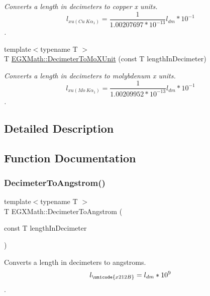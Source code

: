 \begin{DoxyCompactItemize}
\begin{DoxyCompactList}\small\item\em Converts a length in decimeters to copper x units. \[ l_{xu(Cu\ K\alpha_1)}= \frac{1}{1.00207697*10^{-13}} l_{dm} * 10^{-1}\]. \end{DoxyCompactList}\item 
{\footnotesize template$<$typename T $>$ }\\T \mbox{\hyperlink{group___e_g_x_math-_conversions-_length_conversions-_decimeter-_non-_s_i_ga609f53e09c9a767639da3ad72905bb71}{E\+G\+X\+Math\+::\+Decimeter\+To\+Mo\+X\+Unit}} (const T length\+In\+Decimeter)
\begin{DoxyCompactList}\small\item\em Converts a length in decimeters to molybdenum x units. \[ l_{xu(Mo\ K\alpha_1)}=\frac{1}{1.00209952*10^{-13}} l_{dm} * 10^{-1}\]. \end{DoxyCompactList}\end{DoxyCompactItemize}


\subsection{Detailed Description}


\subsection{Function Documentation}
\mbox{\label{group___e_g_x_math-_conversions-_length_conversions-_decimeter-_non-_s_i_gaffa5876e4f15bc859c369e8bfb9e4183}} 
\subsubsection{\texorpdfstring{Decimeter\+To\+Angstrom()}{DecimeterToAngstrom()}}
{\footnotesize\ttfamily template$<$typename T $>$ \\
T E\+G\+X\+Math\+::\+Decimeter\+To\+Angstrom (\begin{DoxyParamCaption}\item[{const T}]{length\+In\+Decimeter }\end{DoxyParamCaption})}



Converts a length in decimeters to angstroms. \[ l_{\unicode{x212B}}=l_{dm} * 10^{9} \]. 

